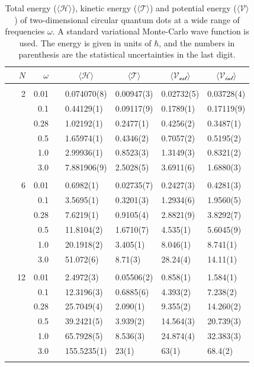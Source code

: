\begin{table}
	\caption{Total energy ($\langle\mathcal{H}\rangle$), kinetic energy ($\langle\mathcal{T}\rangle$) and potential energy ($\langle\mathcal{V}\rangle$) of two-dimensional circular quantum dots at a wide range of frequencies $\omega$. A standard variational Monte-Carlo wave function is used. The energy is given in units of $\hbar$, and the numbers in parenthesis are the statistical uncertainties in the last digit.}
	\label{tab:splitfrequencyQDVMC}
	\begin{tabularx}{\textwidth}{R{1.5cm}rrcR{2.3cm}R{2.3cm}R{2.3cm}R{2.3cm}} \hline\hline
		& & $\omega$ &&  &  &  &  \\ \hline \\
		&2 & 0.01 && 0.074070(8) & 0.00947(3) & 0.02732(5) & 0.03728(4) \\
		&& 0.1 && 0.44129(1) & 0.09117(9) & 0.1789(1) & 0.17119(9) \\
		&& 0.28 && 1.02192(1) & 0.2477(1) & 0.4256(2) & 0.3487(1) \\
		&& 0.5 && 1.65974(1) & 0.4346(2) & 0.7057(2) & 0.5195(2)\\
		&& 1.0 && 2.99936(1) & 0.8523(3) & 1.3149(3) & 0.8321(2)\\
		&& 3.0 && 7.881906(9) & 2.5028(5) & 3.6911(6) & 1.6880(3) \\ \hdashline \\
		
		&6 & 0.01 && 0.6982(1) & 0.02735(7) & 0.2427(3) & 0.4281(3) \\
		&& 0.1 && 3.5695(1) & 0.3201(3) & 1.2934(6) & 1.9560(5) \\
		&& 0.28 && 7.6219(1) & 0.9105(4) & 2.8821(9) & 3.8292(7) \\
		&& 0.5 && 11.8104(2) & 1.6710(7) & 4.535(1) & 5.6045(9)\\
		&& 1.0 && 20.1918(2) & 3.405(1) & 8.046(1) & 8.741(1)\\
		&& 3.0 && 51.072(6) & 8.71(3) & 28.24(4) & 14.11(1) \\ \hdashline \\
		
		&12 & 0.01 && 2.4972(3) & 0.05506(2) & 0.858(1) & 1.584(1)\\
		&& 0.1 && 12.3196(3) & 0.6885(6) & 4.393(2) & 7.238(2) \\
		&& 0.28 && 25.7049(4) & 2.090(1) & 9.355(2) & 14.260(2) \\
		&& 0.5 && 39.2421(5) & 3.939(2) & 14.564(3) & 20.739(3) \\
		&& 1.0 && 65.7928(5) & 8.536(3) & 24.874(4) & 32.383(3) \\
		&& 3.0 && 155.5235(1) & 23(1) & 63(1) & 68.4(2) \\ \hdashline \\
		

\end{tabularx}
\end{table}
